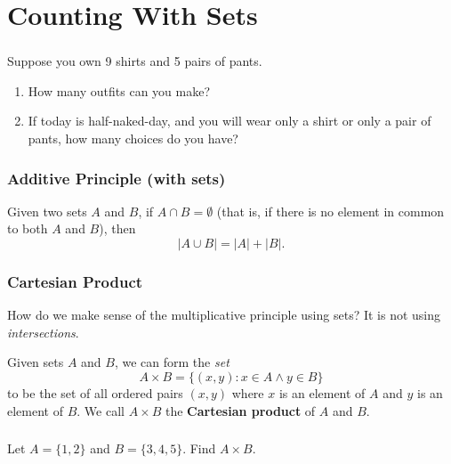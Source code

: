 \documentclass[11pt, compress]{beamer}
\newcommand{\terminology}[1]{\textbf{#1}}
\newcommand{\st}{:}
\newcommand{\card}[1]{\left| #1 \right|}
\begin{document}
\section{Counting With Sets}
\begin{frame}
\frametitle{}
\begin{example}[1.1.6]Suppose you own 9 shirts and 5 pairs of pants.\begin{enumerate}
\item{} How many outfits can you make?


\item{} If today is half-naked-day, and you will wear only a shirt or only a pair of pants, how many choices do you have?

\end{enumerate}

\end{example}
\end{frame}
 
\begin{frame}
\frametitle{Additive Principle (with sets)}
  Given two sets \(A\) and \(B\), if \(A \cap B = \emptyset\) (that is, if there is no element in common to both \(A\) and \(B\)), then%
\begin{equation*}
\card{A \cup B} = \card{A} + \card{B}\text{.}
\end{equation*}

\end{frame}
 
\begin{frame}
\frametitle{Cartesian Product}
 How do we make sense of the multiplicative principle using sets? It is not using \emph{intersections}.
 
\pause \vfill 

Given sets \(A\) and \(B\), we can form the \emph{set}%
\begin{equation*}
A \times B = \{(x,y) \st x \in A \wedge y \in B\}
\end{equation*}
to be the set of all ordered pairs \((x,y)\) where \(x\) is an element of \(A\) and \(y\) is an element of \(B\). We call \(A \times B\) the \terminology{Cartesian product} of \(A\) and \(B\).
\end{frame}
 
\begin{frame}
\frametitle{}
\begin{example}[1.1.7]Let \(A = \{1,2\}\) and \(B=\{3,4,5\}\). Find \(A \times B\).
\end{example}
\end{frame}
 
\end{document}
